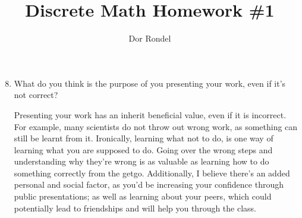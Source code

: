 \documentclass{article}
\title{Discrete Math Homework \#1}
\author{Dor Rondel}
\begin{document}
\maketitle
\newpage

\begin{enumerate}
  \setcounter{enumi}{7}
  \item What do you think is the purpose of you presenting your work,
even if it’s not correct?

Presenting your work has an inherit beneficial value, even if it is incorrect. For example, many scientists do not throw out wrong work, as something can still be learnt from it. Ironically, learning what not to do, is one way of learning what you are supposed to do. Going over the wrong steps and understanding why they're wrong is as valuable as learning how to do something correctly from the getgo. Additionally, I believe there's an added personal and social factor, as you'd be increasing your confidence through public presentations; as well as learning about your peers, which could potentially lead to friendships and will help you through the class. 


\newpage


\end{enumerate}
\end{document}
